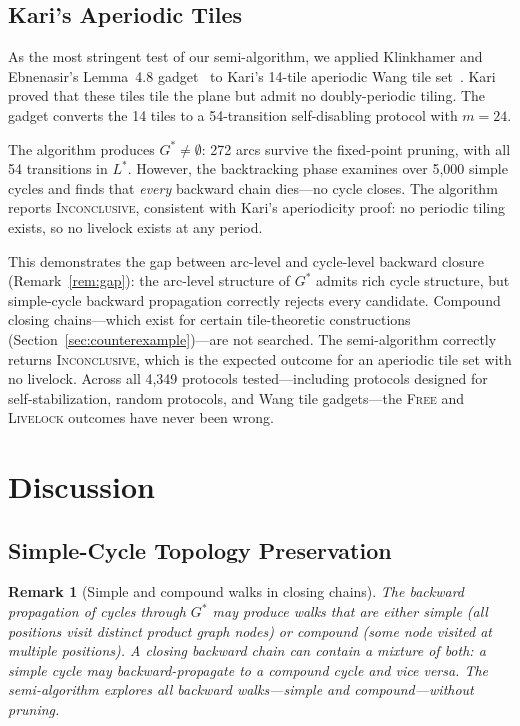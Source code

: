 \documentclass[11pt]{article}
\newtheorem{remark}{Remark}
\begin{document}
\subsection{Kari's Aperiodic Tiles}

As the most stringent test of our semi-algorithm, we applied Klinkhamer and Ebnenasir's Lemma~4.8 gadget~\cite{klinkhamer-tr} to Kari's 14-tile aperiodic Wang tile set~\cite{kari-aperiodic}. Kari proved that these tiles tile the plane but admit no doubly-periodic tiling. The gadget converts the 14 tiles to a 54-transition self-disabling protocol with $m = 24$.

The algorithm produces $G^* \neq \emptyset$: 272 arcs survive the fixed-point pruning, with all 54 transitions in $L^*$. However, the backtracking phase examines over 5{,}000 simple cycles and finds that \emph{every} backward chain dies---no cycle closes. The algorithm reports \textsc{Inconclusive}, consistent with Kari's aperiodicity proof: no periodic tiling exists, so no livelock exists at any period.

This demonstrates the gap between arc-level and cycle-level backward closure (Remark~\ref{rem:gap}): the arc-level structure of $G^*$ admits rich cycle structure, but simple-cycle backward propagation correctly rejects every candidate. Compound closing chains---which exist for certain tile-theoretic constructions (Section~\ref{sec:counterexample})---are not searched. The semi-algorithm correctly returns \textsc{Inconclusive}, which is the expected outcome for an aperiodic tile set with no livelock. Across all 4{,}349 protocols tested---including protocols designed for self-stabilization, random protocols, and Wang tile gadgets---the \textsc{Free} and \textsc{Livelock} outcomes have never been wrong.

\section{Discussion}
\label{sec:discussion}

\subsection{Simple-Cycle Topology Preservation}

\begin{remark}[Simple and compound walks in closing chains]
\label{rem:walk-topology}
The backward propagation of cycles through $G^*$ may produce walks that are either simple (all positions visit distinct product graph nodes) or compound (some node visited at multiple positions). A closing backward chain can contain a mixture of both: a simple cycle may backward-propagate to a compound cycle and vice versa. The semi-algorithm explores all backward walks---simple and compound---without pruning.
\end{remark}
\end{document}
